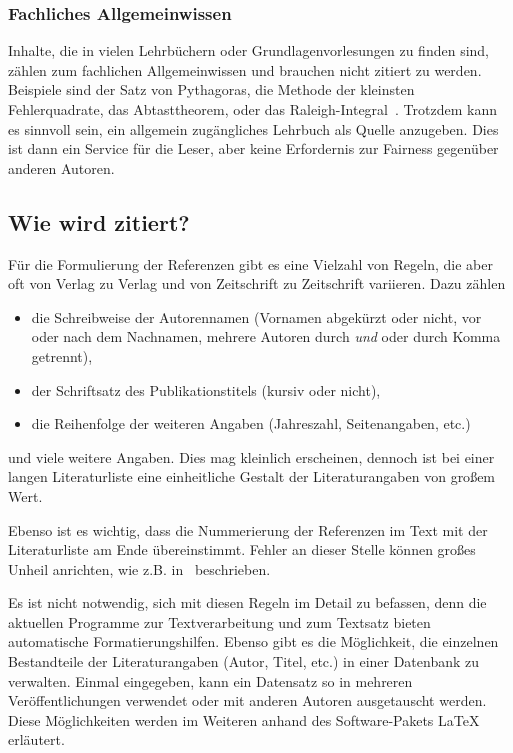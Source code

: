 \documentclass[a4paper, 10pt]{article}
\begin{document}
\subsubsection{Fachliches Allgemeinwissen}

Inhalte, die in vielen Lehrb\"uchern oder Grundlagenvorlesungen zu finden sind,
z\"ahlen zum fachlichen Allgemeinwissen und brauchen nicht zitiert zu werden.
Beispiele sind der Satz von Pythagoras, die Methode der kleinsten
Fehlerquadrate, das Abtasttheorem, oder das
Raleigh-Integral~\cite{Blauert:Acoustics:2009}. Trotzdem kann es sinnvoll sein,
ein allgemein zug\"angliches Lehrbuch als Quelle anzugeben. Dies ist dann ein
Service f\"ur die Leser, aber keine Erfordernis zur Fairness gegen\"uber
anderen Autoren.


\subsection{Wie wird zitiert?}
\label{ssec:wie}

F\"ur die Formulierung der Referenzen gibt es eine Vielzahl von Regeln, die aber oft von Verlag zu Verlag und von Zeitschrift zu Zeitschrift variieren. Dazu z\"ahlen
\begin{itemize}
 \item 
die Schreibweise der Autorennamen (Vornamen abgek\"urzt oder nicht, vor oder nach dem Nachnamen, mehrere Autoren durch \emph{und} oder durch Komma getrennt),
\item
der Schriftsatz des Publikationstitels (kursiv oder nicht),
\item
die Reihenfolge der weiteren Angaben (Jahreszahl, Seitenangaben, etc.)
\end{itemize}
und viele weitere Angaben. Dies mag kleinlich erscheinen, dennoch ist bei einer langen Literaturliste eine einheitliche Gestalt der Literaturangaben von gro{\ss}em Wert.

Ebenso ist es wichtig, dass die Nummerierung der Referenzen im Text mit der Literaturliste am Ende \"ubereinstimmt. Fehler an dieser Stelle k\"onnen gro{\ss}es Unheil anrichten, wie z.B. in~\cite[Kap.~15]{Coe:House_of_Sleep:1997} beschrieben.

Es ist nicht notwendig, sich mit diesen Regeln im Detail zu befassen, denn die
aktuellen Programme zur Textverarbeitung und zum Textsatz bieten automatische Formatierungshilfen. 
Ebenso gibt es die M\"oglichkeit, die einzelnen Bestandteile der Literaturangaben (Autor, Titel, etc.) in einer Datenbank zu verwalten. Einmal eingegeben, kann ein Datensatz so in mehreren Ver\"offentlichungen verwendet oder mit anderen Autoren ausgetauscht werden.
Diese M\"oglichkeiten werden im Weiteren anhand des Software-Pakets \LaTeX{}  erl\"autert.
\end{document}
